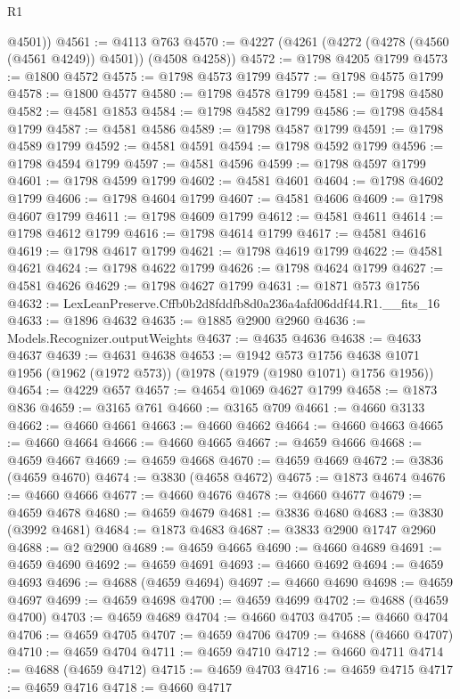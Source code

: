 \begin{lexlean}{R1}
\begin{coremodule}
        @4501))
@4561 := @4113 @763
@4570 := @4227 (@4261 (@4272 (@4278 (@4560 (@4561 @4249)) @4501)) (@4508 @4258))
@4572 := @1798 @4205 @1799
@4573 := @1800 @4572
@4575 := @1798 @4573 @1799
@4577 := @1798 @4575 @1799
@4578 := @1800 @4577
@4580 := @1798 @4578 @1799
@4581 := @1798 @4580
@4582 := @4581 @1853
@4584 := @1798 @4582 @1799
@4586 := @1798 @4584 @1799
@4587 := @4581 @4586
@4589 := @1798 @4587 @1799
@4591 := @1798 @4589 @1799
@4592 := @4581 @4591
@4594 := @1798 @4592 @1799
@4596 := @1798 @4594 @1799
@4597 := @4581 @4596
@4599 := @1798 @4597 @1799
@4601 := @1798 @4599 @1799
@4602 := @4581 @4601
@4604 := @1798 @4602 @1799
@4606 := @1798 @4604 @1799
@4607 := @4581 @4606
@4609 := @1798 @4607 @1799
@4611 := @1798 @4609 @1799
@4612 := @4581 @4611
@4614 := @1798 @4612 @1799
@4616 := @1798 @4614 @1799
@4617 := @4581 @4616
@4619 := @1798 @4617 @1799
@4621 := @1798 @4619 @1799
@4622 := @4581 @4621
@4624 := @1798 @4622 @1799
@4626 := @1798 @4624 @1799
@4627 := @4581 @4626
@4629 := @1798 @4627 @1799
@4631 := @1871 @573 @1756
@4632 := LexLeanPreserve.Cffb0b2d8fddfb8d0a236a4afd06ddf44.R1.__fits_16
@4633 := @1896 @4632
@4635 := @1885 @2900 @2960
@4636 := Models.Recognizer.outputWeights
@4637 := @4635 @4636
@4638 := @4633 @4637
@4639 := @4631 @4638
@4653 := @1942
    @573
    @1756
    @4638
    @1071
    @1956
    (@1962 (@1972 @573))
    (@1978 (@1979 (@1980 @1071) @1756 @1956))
@4654 := @4229 @657
@4657 := @4654 @1069 @4627 @1799
@4658 := @1873 @836
@4659 := @3165 @761
@4660 := @3165 @709
@4661 := @4660 @3133
@4662 := @4660 @4661
@4663 := @4660 @4662
@4664 := @4660 @4663
@4665 := @4660 @4664
@4666 := @4660 @4665
@4667 := @4659 @4666
@4668 := @4659 @4667
@4669 := @4659 @4668
@4670 := @4659 @4669
@4672 := @3836 (@4659 @4670)
@4674 := @3830 (@4658 @4672)
@4675 := @1873 @4674
@4676 := @4660 @4666
@4677 := @4660 @4676
@4678 := @4660 @4677
@4679 := @4659 @4678
@4680 := @4659 @4679
@4681 := @3836 @4680
@4683 := @3830 (@3992 @4681)
@4684 := @1873 @4683
@4687 := @3833 @2900 @1747 @2960
@4688 := @2 @2900
@4689 := @4659 @4665
@4690 := @4660 @4689
@4691 := @4659 @4690
@4692 := @4659 @4691
@4693 := @4660 @4692
@4694 := @4659 @4693
@4696 := @4688 (@4659 @4694)
@4697 := @4660 @4690
@4698 := @4659 @4697
@4699 := @4659 @4698
@4700 := @4659 @4699
@4702 := @4688 (@4659 @4700)
@4703 := @4659 @4689
@4704 := @4660 @4703
@4705 := @4660 @4704
@4706 := @4659 @4705
@4707 := @4659 @4706
@4709 := @4688 (@4660 @4707)
@4710 := @4659 @4704
@4711 := @4659 @4710
@4712 := @4660 @4711
@4714 := @4688 (@4659 @4712)
@4715 := @4659 @4703
@4716 := @4659 @4715
@4717 := @4659 @4716
@4718 := @4660 @4717

\end{coremodule}
\end{lexlean}
